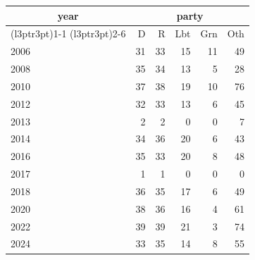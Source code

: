 \footnotesize\begin{tabular}[t]{lrrrrr}
\toprule
\multicolumn{1}{c}{year} & \multicolumn{5}{c}{party} \\
\cmidrule(l{3pt}r{3pt}){1-1} \cmidrule(l{3pt}r{3pt}){2-6}
  & D & R & Lbt & Grn & Oth\\
\midrule
2006 & 31 & 33 & 15 & 11 & 49\\
2008 & 35 & 34 & 13 & 5 & 28\\
2010 & 37 & 38 & 19 & 10 & 76\\
2012 & 32 & 33 & 13 & 6 & 45\\
2013 & 2 & 2 & 0 & 0 & 7\\
2014 & 34 & 36 & 20 & 6 & 43\\
2016 & 35 & 33 & 20 & 8 & 48\\
2017 & 1 & 1 & 0 & 0 & 0\\
2018 & 36 & 35 & 17 & 6 & 49\\
2020 & 38 & 36 & 16 & 4 & 61\\
2022 & 39 & 39 & 21 & 3 & 74\\
2024 & 33 & 35 & 14 & 8 & 55\\
\bottomrule
\end{tabular}
